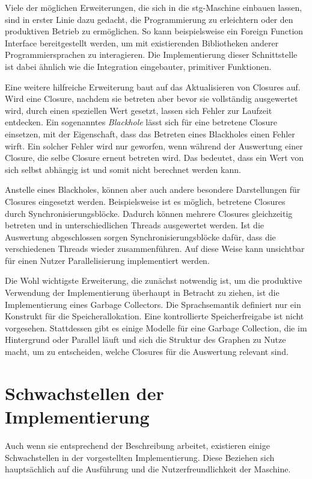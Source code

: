 Viele der möglichen Erweiterungen, die sich in die \gls{stg}-Maschine einbauen lassen, sind in erster Linie dazu gedacht, die Programmierung zu erleichtern oder den produktiven Betrieb zu ermöglichen.
So kann beispielsweise ein Foreign Function Interface bereitgestellt werden, um mit existierenden Bibliotheken anderer Programmiersprachen zu interagieren\cn{}.
Die Implementierung dieser Schnittstelle ist dabei ähnlich wie die Integration eingebauter, primitiver Funktionen.

Eine weitere hilfreiche Erweiterung baut auf das Aktualisieren von Closures auf.
Wird eine Closure, nachdem sie betreten aber bevor sie vollständig ausgewertet wird, durch einen speziellen Wert gesetzt, lassen sich Fehler zur Laufzeit entdecken.
Ein sogenanntes \textit{Blackhole} lässt sich für eine betretene Closure einsetzen, mit der Eigenschaft, dass das Betreten eines Blackholes einen Fehler wirft.
Ein solcher Fehler wird nur geworfen, wenn während der Auswertung einer Closure, die selbe Closure erneut betreten wird.
Das bedeutet, dass ein Wert von sich selbst abhängig ist und somit nicht berechnet werden kann.

Anstelle eines Blackholes, können aber auch andere besondere Darstellungen für Closures eingesetzt werden.
Beispielsweise ist es möglich, betretene Closures durch Synchronisierungsblöcke.
Dadurch können mehrere Closures gleichzeitig betreten und in unterschiedlichen Threads ausgewertet werden.
Ist die Auswertung abgeschlossen sorgen Synchronisierungsblöcke dafür, dass die verschiedenen Threads wieder zusammenführen.
Auf diese Weise kann unsichtbar für einen Nutzer Parallelisierung implementiert werden.

Die Wohl wichtigste Erweiterung, die zunächst notwendig ist, um die produktive Verwendung der Implementierung überhaupt in Betracht zu ziehen, ist die Implementierung eines Garbage Collectors.
Die Sprachsemantik definiert nur ein Konstrukt für die Speicherallokation.
Eine kontrollierte Speicherfreigabe ist nicht vorgesehen.
Stattdessen gibt es einige Modelle für eine Garbage Collection, die im Hintergrund oder Parallel läuft und sich die Struktur des Graphen zu Nutze macht, um zu entscheiden, welche Closures für die Auswertung relevant sind\cn{}.


\section{Schwachstellen der Implementierung}

Auch wenn sie entsprechend der Beschreibung arbeitet, existieren einige Schwachstellen in der vorgestellten Implementierung.
Diese Beziehen sich hauptsächlich auf die Ausführung und die Nutzerfreundlichkeit der Maschine.

